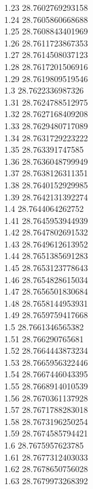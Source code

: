 {1.23	28.7602769293158\\
1.24	28.7605860668688\\
1.25	28.7608843401969\\
1.26	28.7611723867353\\
1.27	28.7614508037123\\
1.28	28.7617201506916\\
1.29	28.7619809519546\\
1.3	28.7622336987326\\
1.31	28.7624788512975\\
1.32	28.7627168409208\\
1.33	28.7629480717089\\
1.34	28.7631729223222\\
1.35	28.763391747585\\
1.36	28.7636048799949\\
1.37	28.7638126311351\\
1.38	28.7640152929985\\
1.39	28.7642131392274\\
1.4	28.7644064262752\\
1.41	28.7645953944939\\
1.42	28.7647802691532\\
1.43	28.7649612613952\\
1.44	28.7651385691283\\
1.45	28.7653123778643\\
1.46	28.7654828615034\\
1.47	28.7656501830684\\
1.48	28.7658144953931\\
1.49	28.7659759417668\\
1.5	28.7661346565382\\
1.51	28.766290765681\\
1.52	28.7664443873234\\
1.53	28.7665956322446\\
1.54	28.7667446043395\\
1.55	28.7668914010539\\
1.56	28.7670361137928\\
1.57	28.7671788283018\\
1.58	28.7673196250254\\
1.59	28.7674585794421\\
1.6	28.7675957623785\\
1.61	28.7677312403033\\
1.62	28.7678650756028\\
1.63	28.7679973268392\\
}
